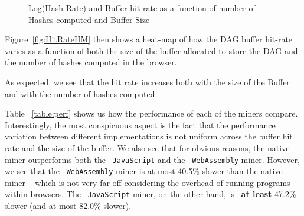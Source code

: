 \documentclass[runningheads]{llncs}
\begin{document}
\begin{figure}[t]
\captionsetup{justification=centering}
       \centering
\caption{Log(Hash Rate) and Buffer hit rate as a function of number of Hashes computed and Buffer Size}
\end{figure}

Figure~\ref{fig:HitRateHM} then shows a heat-map of how the DAG buffer hit-rate varies as a function of both the size of the buffer allocated to store the DAG and the number of hashes computed in the browser. 

As expected, we see that the hit rate increases both with the size of the Buffer and with the number of hashes computed.

Table ~\ref{table:perf} shows us how the performance of each of the miners compare. Interestingly, the most conspicuous aspect is the fact that the performance variation between different implementations is not uniform across the buffer hit rate and the size of the buffer. We also see that for obvious reasons, the native miner outperforms both the ~\verb|JavaScript| and the ~\verb|WebAssembly| miner. However, we see that the ~\verb|WebAssembly| miner is at most 40.5\% slower than the native miner -- which is not very far off considering the overhead of running programs within browsers. The ~\verb|JavaScript| miner, on the other hand, is ~\textbf{at least} 47.2\% slower (and at most 82.0\% slower).
\end{document}
